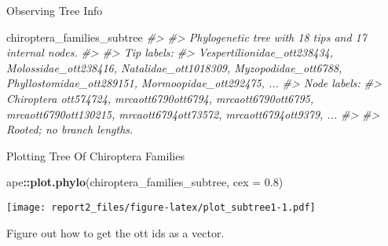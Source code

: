 \documentclass[]{article}
\newenvironment{Shaded}{\begin{snugshade}}{\end{snugshade}}
\newcommand{\CommentTok}[1]{\textcolor[rgb]{0.56,0.35,0.01}{\textit{#1}}}
\newcommand{\DataTypeTok}[1]{\textcolor[rgb]{0.13,0.29,0.53}{#1}}
\newcommand{\FloatTok}[1]{\textcolor[rgb]{0.00,0.00,0.81}{#1}}
\newcommand{\KeywordTok}[1]{\textcolor[rgb]{0.13,0.29,0.53}{\textbf{#1}}}
\newcommand{\NormalTok}[1]{#1}
\newcommand{\OperatorTok}[1]{\textcolor[rgb]{0.81,0.36,0.00}{\textbf{#1}}}
\begin{document}
Observing Tree Info

\begin{Shaded}
\begin{Highlighting}[]
\NormalTok{chiroptera_families_subtree}
\CommentTok{#> }
\CommentTok{#> Phylogenetic tree with 18 tips and 17 internal nodes.}
\CommentTok{#> }
\CommentTok{#> Tip labels:}
\CommentTok{#>  Vespertilionidae_ott238434, Molossidae_ott238416, Natalidae_ott1018309, Myzopodidae_ott6788, Phyllostomidae_ott289151, Mormoopidae_ott292475, ...}
\CommentTok{#> Node labels:}
\CommentTok{#>  Chiroptera ott574724, mrcaott6790ott6794, mrcaott6790ott6795, mrcaott6790ott130215, mrcaott6794ott73572, mrcaott6794ott9379, ...}
\CommentTok{#> }
\CommentTok{#> Rooted; no branch lengths.}
\end{Highlighting}
\end{Shaded}

Plotting Tree Of Chiroptera Families

\begin{Shaded}
\begin{Highlighting}[]
\NormalTok{ape}\OperatorTok{::}\KeywordTok{plot.phylo}\NormalTok{(chiroptera_families_subtree, }\DataTypeTok{cex =} \FloatTok{0.8}\NormalTok{)}
\end{Highlighting}
\end{Shaded}

\texttt{[image: report2\_files/figure-latex/plot\_subtree1-1.pdf]}

Figure out how to get the ott ids as a vector.

\begin{Shaded}
\end{Shaded}

\begin{Shaded}
\end{Shaded}
\end{document}
